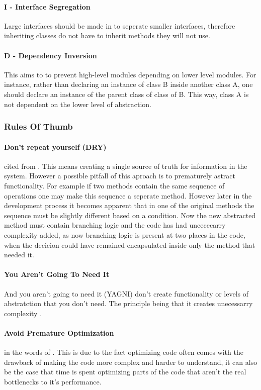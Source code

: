       \paragraph{I - Interface Segregation}
        Large interfaces should be made in to seperate smaller interfaces, therefore inheriting classes do not have to inherit methods they will not use.
      \paragraph{D - Dependency Inversion}
        This aims to to prevent high-level modules depending on lower level modules. For instance, rather than declaring an instance of class B inside another class A, one should declare an instance of the parent class of class of B. This way, class A is not dependent on the lower level of abstraction.
    \subsubsection{Rules Of Thumb}
      \paragraph{Don't repeat yourself (DRY)}
        cited from \citep{hunt2000pragmatic}. This means creating a single source of truth for information in the system. However a possible pitfall of this aproach is to prematurely astract functionality. For example if two methods contain the same sequence of operations one may make this sequence a seperate method. However later in the development process it becomes apparent that in one of the original methods the sequence must be slightly different based on a condition. Now the new abstracted method must contain branching logic and the code has had uncececarry complexity added, as now branching logic is present at two places in the code, when the decicion could have remained encapsulated inside only the method that needed it.
      \paragraph{You Aren't Going To Need It}
       And you aren't going to need it (YAGNI) don't create functionality or levels of abstratction that you don't need. The principle being that it creates unecessarry complexity \citep{hunt2000pragmatic}.
      \paragraph{Avoid Premature Optimization}
        in the words of \citep{Knuth1974} . This is due to the fact optimizing code often comes with the drawback of making the code more complex and harder to understand, it can also be the case that time is spent optimizing parts of the code that aren't the real bottlenecks to it's performance.


